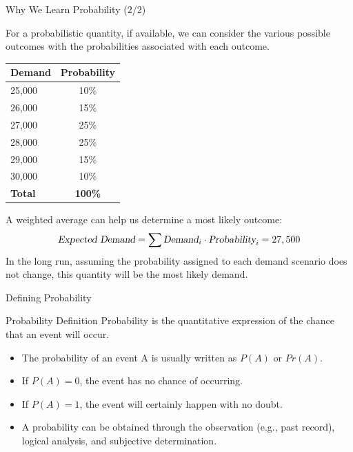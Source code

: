 \documentclass{beamer}
\begin{document}
\begin{frame}{Why We Learn Probability (2/2)}

For a probabilistic quantity, if available, we can consider the various possible outcomes with the probabilities associated with each outcome. 


\begin{scriptsize}
\begin{center}

\begin{tabular}{l|c}
\hline
\textbf{Demand} & \textbf{Probability} \\ \hline
25,000          & 10\%                 \\ \hline
26,000          & 15\%                 \\ \hline
27,000          & 25\%                 \\ \hline
28,000          & 25\%                 \\ \hline
29,000          & 15\%                 \\ \hline
30,000          & 10\%                 \\ \hline
\textbf{Total}  & \textbf{100\%}       \\ \hline
\end{tabular}
\end{center}
\end{scriptsize}

A weighted average can help us determine a most likely outcome: 
$$\textsl{Expected Demand} = \sum \textsl{Demand}_i \cdot \textsl{Probability}_i = 27,500$$
In the long run, assuming the probability assigned to each demand scenario does not change, this quantity will be the most likely demand.
\end{frame}


\begin{frame}{Defining Probability}

\begin{block}{Probability Definition}
Probability is the quantitative expression of the chance that an event will occur.
\end{block}

\vspace{0.3cm}
\begin{itemize}
\item The probability of an event A is usually written as $P(A)$ or $Pr(A)$.
\item If $P(A) = 0$, the event has no chance of occurring.
\item If $P(A) = 1$, the event will certainly happen with no doubt.
\item A probability can be obtained through the observation (e.g., past record), logical analysis, and subjective determination.
\end{itemize}

\end{frame}
\end{document}

